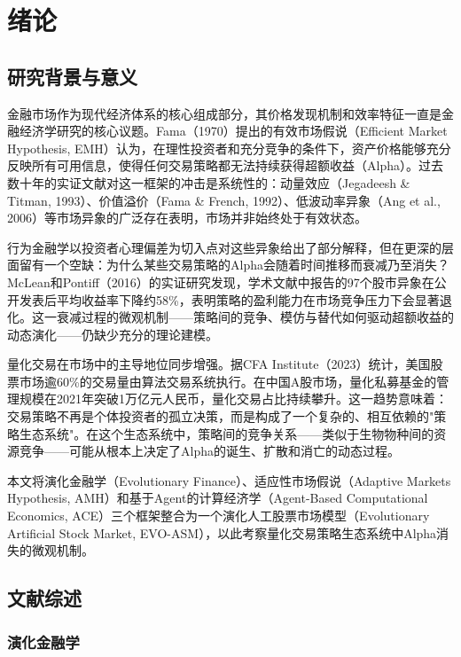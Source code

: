 ﻿\chapter{绪论}
\label{chap:introduction}

\section{研究背景与意义}

金融市场作为现代经济体系的核心组成部分，其价格发现机制和效率特征一直是金融经济学研究的核心议题。Fama（1970）提出的有效市场假说（Efficient Market Hypothesis, EMH）认为，在理性投资者和充分竞争的条件下，资产价格能够充分反映所有可用信息，使得任何交易策略都无法持续获得超额收益（Alpha）。过去数十年的实证文献对这一框架的冲击是系统性的：动量效应（Jegadeesh \& Titman, 1993）、价值溢价（Fama \& French, 1992）、低波动率异象（Ang et al., 2006）等市场异象的广泛存在表明，市场并非始终处于有效状态。

行为金融学以投资者心理偏差为切入点对这些异象给出了部分解释，但在更深的层面留有一个空缺：为什么某些交易策略的Alpha会随着时间推移而衰减乃至消失？McLean和Pontiff（2016）的实证研究发现，学术文献中报告的97个股市异象在公开发表后平均收益率下降约58\%，表明策略的盈利能力在市场竞争压力下会显著退化。这一衰减过程的微观机制——策略间的竞争、模仿与替代如何驱动超额收益的动态演化——仍缺少充分的理论建模。

量化交易在市场中的主导地位同步增强。据CFA Institute（2023）统计，美国股票市场逾60\%的交易量由算法交易系统执行。在中国A股市场，量化私募基金的管理规模在2021年突破1万亿元人民币，量化交易占比持续攀升。这一趋势意味着：交易策略不再是个体投资者的孤立决策，而是构成了一个复杂的、相互依赖的"策略生态系统"。在这个生态系统中，策略间的竞争关系——类似于生物物种间的资源竞争——可能从根本上决定了Alpha的诞生、扩散和消亡的动态过程。

本文将演化金融学（Evolutionary Finance）、适应性市场假说（Adaptive Markets Hypothesis, AMH）和基于Agent的计算经济学（Agent-Based Computational Economics, ACE）三个框架整合为一个演化人工股票市场模型（Evolutionary Artificial Stock Market, EVO-ASM），以此考察量化交易策略生态系统中Alpha消失的微观机制。

\section{文献综述}

\subsection{演化金融学}

